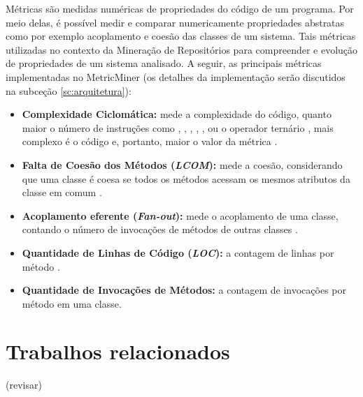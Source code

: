 \documentclass[a4paper, 12pt, twoside]{book}
\newcommand{\codechunk}[1]{{\ttfamily {\small #1}}}
\begin{document}
    Métricas são medidas numéricas de propriedades do código de um programa. Por meio delas, é possível medir e comparar numericamente propriedades abstratas como por exemplo acoplamento e coesão das classes de um sistema. Tais métricas utilizadas no contexto da Mineração de Repositórios para compreender e evolução de propriedades de um sistema analisado. A seguir, as principais métricas implementadas no MetricMiner (os detalhes da implementação serão discutidos na subceção \ref{sc:arquitetura}):

    \begin{itemize} 
        \item \textbf{Complexidade Ciclomática:} mede a complexidade do código, quanto maior o número de instruções como \codechunk{if}, \codechunk{while}, \codechunk{case}, \codechunk{\&\&}, \codechunk{||}, ou o operador ternário \codechunk{?}, mais complexo é o código e, portanto, maior o valor da métrica \cite{maccabe:76}.
        \item \textbf{Falta de Coesão dos Métodos (\textit{LCOM}):} mede a coesão, considerando que uma classe é coesa se todos os métodos acessam os mesmos atributos da classe em comum \cite{henderson:96}.
        \item \textbf{Acoplamento eferente (\textit{Fan-out}):} mede o acoplamento de uma classe, contando o número de invocações de métodos de outras classes \cite{lorenz:94}.
        \item \textbf{Quantidade de Linhas de Código (\textit{LOC}):} a contagem de linhas por método \cite{chidamber:94}.
        \item \textbf{Quantidade de Invocações de Métodos:} a contagem de invocações por método \cite{li:93} em uma classe.
    \end{itemize}

\chapter{Trabalhos relacionados} \label{ch:trabalhos}

(revisar)
\end{document}
